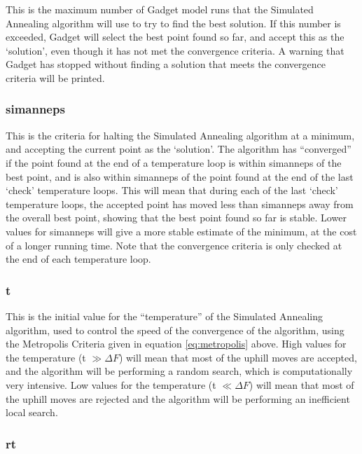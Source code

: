 \documentclass[]{book}
\begin{document}
This is the maximum number of Gadget model runs that the Simulated
Annealing algorithm will use to try to find the best solution. If this
number is exceeded, Gadget will select the best point found so far, and
accept this as the `solution', even though it has not met the
convergence criteria. A warning that Gadget has stopped without finding
a solution that meets the convergence criteria will be printed.

\hypertarget{simanneps}{%
\subsubsection{simanneps}\label{simanneps}}

This is the criteria for halting the Simulated Annealing algorithm at a
minimum, and accepting the current point as the `solution'. The
algorithm has ``converged'' if the point found at the end of a temperature
loop is within simanneps of the best point, and is also within simanneps
of the point found at the end of the last `check' temperature loops.
This will mean that during each of the last `check' temperature loops,
the accepted point has moved less than simanneps away from the overall
best point, showing that the best point found so far is stable. Lower
values for simanneps will give a more stable estimate of the minimum, at
the cost of a longer running time. Note that the convergence criteria is
only checked at the end of each temperature loop.

\hypertarget{t}{%
\subsubsection{t}\label{t}}

This is the initial value for the ``temperature'' of the Simulated
Annealing algorithm, used to control the speed of the convergence of the
algorithm, using the Metropolis Criteria given in
equation \eqref{eq:metropolis} above. High values for the temperature (t
\(\gg \Delta F\)) will mean that most of the uphill moves are accepted,
and the algorithm will be performing a random search, which is
computationally very intensive. Low values for the temperature (t
\(\ll \Delta F\)) will mean that most of the uphill moves are rejected and
the algorithm will be performing an inefficient local search.

\hypertarget{rt}{%
\subsubsection{rt}\label{rt}}
\end{document}
